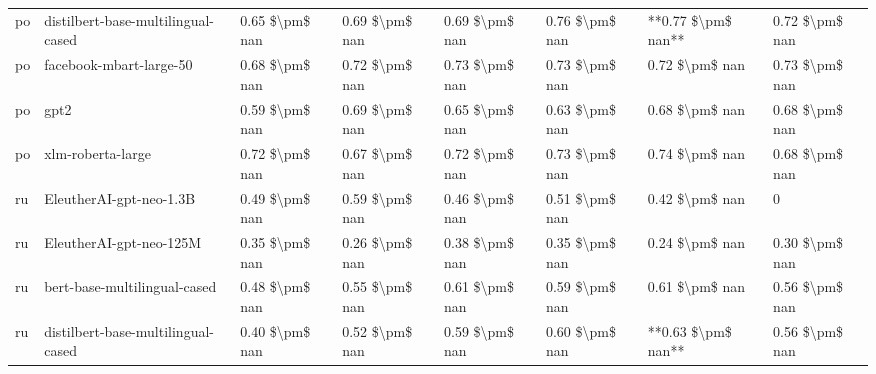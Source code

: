 \begin{tabular}{llllllll}
      po & distilbert-base-multilingual-cased & 0.65 \$\textbackslash pm\$ nan &            0.69 \$\textbackslash pm\$ nan &        0.69 \$\textbackslash pm\$ nan &         0.76 \$\textbackslash pm\$ nan &                      **0.77 \$\textbackslash pm\$ nan** &     0.72 \$\textbackslash pm\$ nan \\
      po &            facebook-mbart-large-50 & 0.68 \$\textbackslash pm\$ nan &            0.72 \$\textbackslash pm\$ nan &        0.73 \$\textbackslash pm\$ nan &         0.73 \$\textbackslash pm\$ nan &                          0.72 \$\textbackslash pm\$ nan &     0.73 \$\textbackslash pm\$ nan \\
      po &                               gpt2 & 0.59 \$\textbackslash pm\$ nan &            0.69 \$\textbackslash pm\$ nan &        0.65 \$\textbackslash pm\$ nan &         0.63 \$\textbackslash pm\$ nan &                          0.68 \$\textbackslash pm\$ nan &     0.68 \$\textbackslash pm\$ nan \\
      po &                  xlm-roberta-large & 0.72 \$\textbackslash pm\$ nan &            0.67 \$\textbackslash pm\$ nan &        0.72 \$\textbackslash pm\$ nan &         0.73 \$\textbackslash pm\$ nan &                          0.74 \$\textbackslash pm\$ nan &     0.68 \$\textbackslash pm\$ nan \\
      ru &            EleutherAI-gpt-neo-1.3B & 0.49 \$\textbackslash pm\$ nan &            0.59 \$\textbackslash pm\$ nan &        0.46 \$\textbackslash pm\$ nan &         0.51 \$\textbackslash pm\$ nan &                          0.42 \$\textbackslash pm\$ nan &                  0 \\
      ru &            EleutherAI-gpt-neo-125M & 0.35 \$\textbackslash pm\$ nan &            0.26 \$\textbackslash pm\$ nan &        0.38 \$\textbackslash pm\$ nan &         0.35 \$\textbackslash pm\$ nan &                          0.24 \$\textbackslash pm\$ nan &     0.30 \$\textbackslash pm\$ nan \\
      ru &       bert-base-multilingual-cased & 0.48 \$\textbackslash pm\$ nan &            0.55 \$\textbackslash pm\$ nan &        0.61 \$\textbackslash pm\$ nan &         0.59 \$\textbackslash pm\$ nan &                          0.61 \$\textbackslash pm\$ nan &     0.56 \$\textbackslash pm\$ nan \\
      ru & distilbert-base-multilingual-cased & 0.40 \$\textbackslash pm\$ nan &            0.52 \$\textbackslash pm\$ nan &        0.59 \$\textbackslash pm\$ nan &         0.60 \$\textbackslash pm\$ nan &                      **0.63 \$\textbackslash pm\$ nan** &     0.56 \$\textbackslash pm\$ nan \\

\end{tabular}
